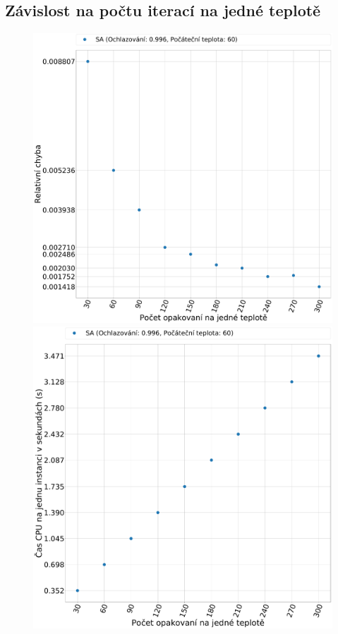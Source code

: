 \documentclass[11pt]{article}
\begin{document}
\subsection{Závislost na počtu iterací na jedné teplotě}
 \begin{figure}
	\centering
    \begin{minipage}[c]{0.42\textwidth}
        \centering\includegraphics[width=\textwidth]{img/CE.pdf} 
    \end{minipage}
    \begin{minipage}[c]{0.42\textwidth}
        \centering \includegraphics[width=\textwidth]{img/CT.pdf} 

\end{minipage}
\end{figure}
\end{document}
